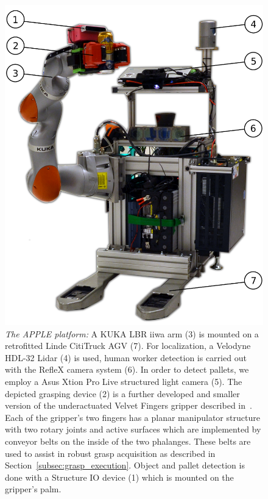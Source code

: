 \begin{figure}[t!]
\begin{center}
\includegraphics[width =0.85\linewidth]{figs/apple_demonstrator}
\caption{\textit{The APPLE platform:} A KUKA LBR iiwa arm (3) is mounted on a retrofitted Linde
  CitiTruck AGV (7). For localization, a Velodyne HDL-32 Lidar (4) is used, human worker detection
  is carried out with the RefleX camera system (6). In order to detect pallets, we employ a Asus
  Xtion Pro Live structured light camera (5). The depicted grasping device (2) is a further
  developed and smaller version of the underactuated Velvet Fingers gripper described
  in~\cite{Tinc12}. Each of the gripper’s two fingers has a planar manipulator structure with two
  rotary joints and active surfaces which are implemented by conveyor belts on the inside of the two
  phalanges. These belts are used to assist in robust grasp acquisition as described in
  Section~\ref{subsec:grasp_execution}. Object and pallet detection is done with a Structure IO
  device (1) which is mounted on the gripper's palm.}
\label{fig:robot}
\vspace{-0.5cm}
\end{center}
\end{figure}


